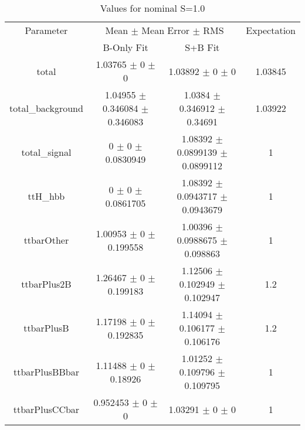 \begin{table}
\centering
\caption{Values for nominal S=1.0}
\begin{tabular}{cccc}
\toprule
Parameter & \multicolumn{2}{c}{Mean $\pm$ Mean Error $\pm$ RMS} & Expectation\\
 & B-Only Fit & S+B Fit & \\
\midrule
total & \num{1.03765} $\pm$ \num{0} $\pm$ \num{0} & \num{1.03892} $\pm$ \num{0} $\pm$ \num{0} & \num{1.03845}\\
total\_background & \num{1.04955} $\pm$ \num{0.346084} $\pm$ \num{0.346083} & \num{1.0384} $\pm$ \num{0.346912} $\pm$ \num{0.34691} & \num{1.03922}\\
total\_signal & \num{0} $\pm$ \num{0} $\pm$ \num{0.0830949} & \num{1.08392} $\pm$ \num{0.0899139} $\pm$ \num{0.0899112} & \num{1}\\
ttH\_hbb & \num{0} $\pm$ \num{0} $\pm$ \num{0.0861705} & \num{1.08392} $\pm$ \num{0.0943717} $\pm$ \num{0.0943679} & \num{1}\\
ttbarOther & \num{1.00953} $\pm$ \num{0} $\pm$ \num{0.199558} & \num{1.00396} $\pm$ \num{0.0988675} $\pm$ \num{0.098863} & \num{1}\\
ttbarPlus2B & \num{1.26467} $\pm$ \num{0} $\pm$ \num{0.199183} & \num{1.12506} $\pm$ \num{0.102949} $\pm$ \num{0.102947} & \num{1.2}\\
ttbarPlusB & \num{1.17198} $\pm$ \num{0} $\pm$ \num{0.192835} & \num{1.14094} $\pm$ \num{0.106177} $\pm$ \num{0.106176} & \num{1.2}\\
ttbarPlusBBbar & \num{1.11488} $\pm$ \num{0} $\pm$ \num{0.18926} & \num{1.01252} $\pm$ \num{0.109796} $\pm$ \num{0.109795} & \num{1}\\
ttbarPlusCCbar & \num{0.952453} $\pm$ \num{0} $\pm$ \num{0} & \num{1.03291} $\pm$ \num{0} $\pm$ \num{0} & \num{1}\\
\bottomrule
\end{tabular}
\end{table}